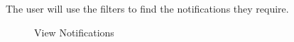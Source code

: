 \documentclass[12pt]{article}
\begin{document}
The user will use the filters to find the notifications they require.
\begin{figure}[H]
\centering	
{}
\caption{View Notifications}

\end{figure}
\newpage
\end{document}
